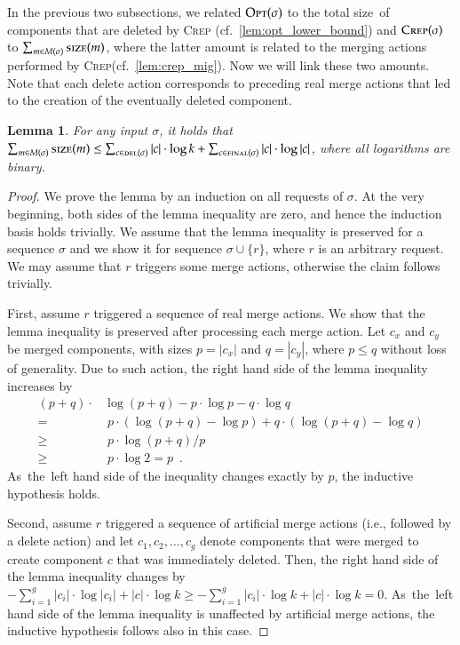 \documentclass[11pt,a4paper]{scrartcl}
\newtheorem{lemma}[theorem]{Lemma}
\newcommand{\OPT}{\textsc{Opt}\xspace}
\newcommand{\CREP}{\textsc{Crep}\xspace}
\newcommand{\del}{\textsc{del}}
\newcommand{\final}{\textsc{final}}
\newcommand{\size}{\textsc{size}}
\begin{document}
In the previous two subsections, we related $\OPT(\sigma)$ to the total
size~of components that are deleted by \CREP
(cf.~\cref{lem:opt_lower_bound}) and $\CREP(\sigma)$ to $\sum_{m \in
M(\sigma)} \size(m)$, where the latter amount is related to the merging
actions performed by \CREP (cf.~\cref{lem:crep_mig}). Now we will link
these two amounts. Note that each delete action corresponds to preceding real
merge actions that led to the creation of the eventually deleted component.

\begin{lemma}
\label{lem:bounding_merges}
For any input $\sigma$, it holds that 
$\sum_{m \in M(\sigma)} \size(m) 
	\leq \sum_{c \in \del(\sigma)} |c| \cdot \log k +
	\sum_{c \in \final(\sigma)} |c| \cdot \log |c|$,
where all logarithms are binary.
\end{lemma}

\begin{proof}
We prove the lemma by an induction on all requests of $\sigma$. At the very beginning, both sides of the lemma
inequality are zero, and hence the induction basis holds trivially. 
We assume that the lemma inequality is preserved for a sequence $\sigma$ and we show it for 
sequence $\sigma \cup \{ r \}$, where $r$ is an arbitrary request. We may assume that $r$ 
triggers some merge actions, otherwise the claim follows trivially.

First, assume $r$ triggered a sequence of real merge actions. We show that the
lemma inequality is preserved after processing each merge action. Let $c_x$
and $c_y$ be merged components, with sizes $p = |c_x|$ and $q = |c_y|$, where
$p \leq q$ without loss of generality. Due to such action, the right hand side
of the lemma inequality increases by
\begin{align*}
  (p + q) \cdot & \log (p + q) - p \cdot \log p - q \cdot \log q \\
		= &\; p \cdot (\log (p+q) - \log p) + q \cdot (\log (p+q) - \log q) \\
		\geq &\; p \cdot \log (p+q) / p \\
		\geq &\; p \cdot \log 2 = p \enspace.
\end{align*}
As~the~left hand side of the inequality changes exactly by $p$, the inductive
hypothesis holds.

Second, assume $r$ triggered a sequence of artificial merge actions (i.e., followed by a
delete action) and let $c_1, c_2, \ldots, c_g$ denote components that were
merged to create component $c$ that was immediately deleted. Then, the right
hand side of the lemma inequality changes by $- \sum_{i = 1}^g |c_i| \cdot
\log |c_i| + |c| \cdot \log k
\geq - \sum_{i = 1}^g |c_i| \cdot \log k + |c| \cdot \log k = 0$.
As~the~left hand side of the lemma inequality is unaffected by artificial
merge actions, the inductive hypothesis follows also in this case.
\end{proof}
\end{document}
